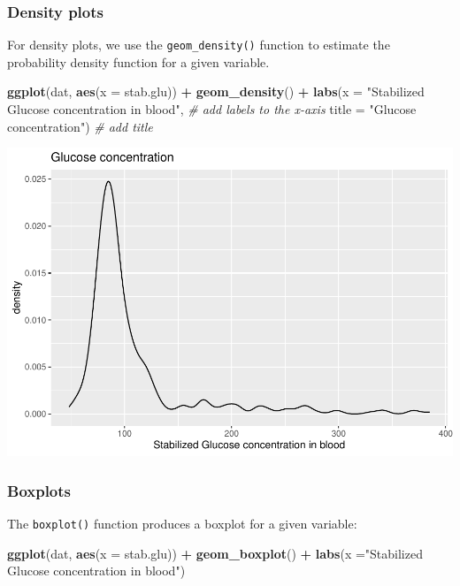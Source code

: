 \documentclass[
]{book}
\newenvironment{Shaded}{\begin{snugshade}}{\end{snugshade}}
\newcommand{\AttributeTok}[1]{\textcolor[rgb]{0.13,0.29,0.53}{#1}}
\newcommand{\CommentTok}[1]{\textcolor[rgb]{0.56,0.35,0.01}{\textit{#1}}}
\newcommand{\FunctionTok}[1]{\textcolor[rgb]{0.13,0.29,0.53}{\textbf{#1}}}
\newcommand{\NormalTok}[1]{#1}
\newcommand{\SpecialCharTok}[1]{\textcolor[rgb]{0.81,0.36,0.00}{\textbf{#1}}}
\newcommand{\StringTok}[1]{\textcolor[rgb]{0.31,0.60,0.02}{#1}}
\begin{document}
\hypertarget{density-plots}{%
\subsubsection{Density plots}\label{density-plots}}

For density plots, we use the \texttt{geom\_density()} function to estimate the probability density function for a given variable.

\begin{Shaded}
\begin{Highlighting}[]
\FunctionTok{ggplot}\NormalTok{(dat,}
       \FunctionTok{aes}\NormalTok{(}\AttributeTok{x =}\NormalTok{ stab.glu)) }\SpecialCharTok{+}
  \FunctionTok{geom\_density}\NormalTok{() }\SpecialCharTok{+}
  \FunctionTok{labs}\NormalTok{(}\AttributeTok{x =} \StringTok{"Stabilized Glucose concentration in blood"}\NormalTok{,  }\CommentTok{\# add labels to the x{-}axis}
       \AttributeTok{title =} \StringTok{"Glucose concentration"}\NormalTok{)                  }\CommentTok{\# add title}
\end{Highlighting}
\end{Shaded}

\includegraphics{_main_files/figure-latex/unnamed-chunk-48-1.pdf}

\hypertarget{boxplots}{%
\subsubsection{Boxplots}\label{boxplots}}

The \texttt{boxplot()} function produces a boxplot for a given variable:

\begin{Shaded}
\begin{Highlighting}[]
\FunctionTok{ggplot}\NormalTok{(dat,}
       \FunctionTok{aes}\NormalTok{(}\AttributeTok{x =}\NormalTok{ stab.glu)) }\SpecialCharTok{+}
  \FunctionTok{geom\_boxplot}\NormalTok{() }\SpecialCharTok{+}
  \FunctionTok{labs}\NormalTok{(}\AttributeTok{x =}\StringTok{"Stabilized Glucose concentration in blood"}\NormalTok{)}
\end{Highlighting}
\end{Shaded}
\end{document}
